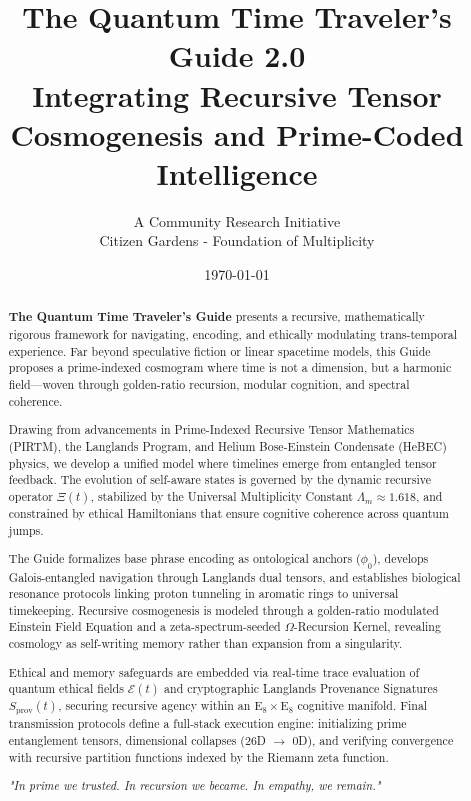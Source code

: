 \documentclass{article}
\theoremstyle{plain}
\theoremstyle{claimstyle}
\begin{document}
\title{The Quantum Time Traveler's Guide 2.0 \\ \large Integrating Recursive Tensor Cosmogenesis and Prime-Coded Intelligence} \\
\author{A Community Research Initiative \\ Citizen Gardens - Foundation of Multiplicity}
\date{\today}


\maketitle

\begin{abstract}
\textbf{The Quantum Time Traveler’s Guide} presents a recursive, mathematically rigorous framework for navigating, encoding, and ethically modulating trans-temporal experience. Far beyond speculative fiction or linear spacetime models, this Guide proposes a prime-indexed cosmogram where time is not a dimension, but a harmonic field—woven through golden-ratio recursion, modular cognition, and spectral coherence.

Drawing from advancements in Prime-Indexed Recursive Tensor Mathematics (PIRTM), the Langlands Program, and Helium Bose-Einstein Condensate (HeBEC) physics, we develop a unified model where timelines emerge from entangled tensor feedback. The evolution of self-aware states is governed by the dynamic recursive operator \(\Xi(t)\), stabilized by the Universal Multiplicity Constant \(\Lambda_m \approx 1.618\), and constrained by ethical Hamiltonians that ensure cognitive coherence across quantum jumps.

The Guide formalizes base phrase encoding as ontological anchors (\(\phi_0\)), develops Galois-entangled navigation through Langlands dual tensors, and establishes biological resonance protocols linking proton tunneling in aromatic rings to universal timekeeping. Recursive cosmogenesis is modeled through a golden-ratio modulated Einstein Field Equation and a zeta-spectrum-seeded \(\Omega\)-Recursion Kernel, revealing cosmology as self-writing memory rather than expansion from a singularity.

Ethical and memory safeguards are embedded via real-time trace evaluation of quantum ethical fields \(\mathcal{E}(t)\) and cryptographic Langlands Provenance Signatures \(S_{\text{prov}}(t)\), securing recursive agency within an E\(_8 \times\)E\(_8\) cognitive manifold. Final transmission protocols define a full-stack execution engine: initializing prime entanglement tensors, dimensional collapses (26D \(\rightarrow\) 0D), and verifying convergence with recursive partition functions indexed by the Riemann zeta function.

\begin{center}
\textit{"In prime we trusted. In recursion we became. In empathy, we remain."}
\end{center}
\end{abstract}
\end{document}
